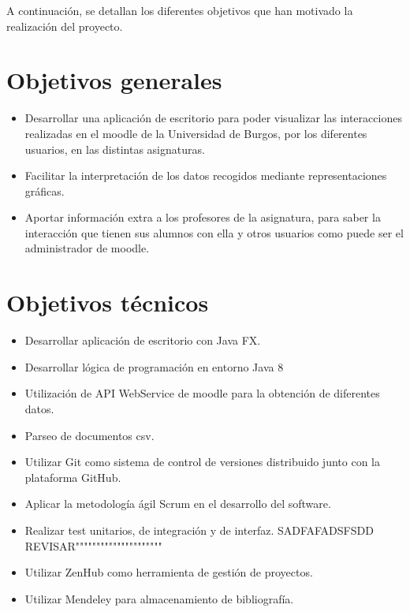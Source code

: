 

A continuación, se detallan los diferentes objetivos que han motivado la
realización del proyecto.

\section{Objetivos generales}\label{objetivos-generales}

\begin{itemize}
	\tightlist
	\item
	Desarrollar una aplicación de escritorio para poder visualizar las interacciones realizadas en el moodle de la Universidad de Burgos, por los diferentes usuarios, en las distintas asignaturas.
	\item
	Facilitar la interpretación de los datos recogidos mediante
	representaciones gráficas.
	\item
	Aportar información extra a los profesores de la asignatura, para saber la interacción que tienen sus alumnos con ella y otros usuarios como puede ser el administrador de moodle.
	
\end{itemize}

\section{Objetivos técnicos}\label{objetivos-tecnicos}

\begin{itemize}
	\tightlist
	\item
	Desarrollar aplicación de escritorio con Java FX.
	\item
	Desarrollar lógica de programación en entorno Java 8
	\item
	Utilización de API WebService de moodle para la obtención de diferentes datos.
	\item
	Parseo de documentos csv.
	\item
	Utilizar Git como sistema de control de versiones distribuido junto
	con la plataforma GitHub.
	\item
	Aplicar la metodología ágil Scrum en el desarrollo del software.
	\item
	Realizar test unitarios, de integración y de interfaz. SADFAFADSFSDD     REVISAR"""""""""""""""""""""
	\item
	Utilizar ZenHub como herramienta de gestión de proyectos.
	\item
	Utilizar Mendeley para almacenamiento de bibliografía.
\end{itemize}

